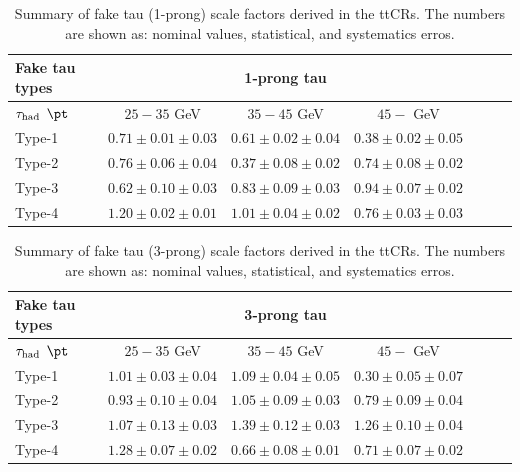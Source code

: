 \begin{table}
\caption{ Summary of fake tau (1-prong) scale factors derived in the ttCRs. The numbers are shown as: nominal values, statistical, and systematics erros. }
\begin{center}
\begin{tabular}{lcccccc}
\toprule\toprule

Fake tau types & \multicolumn{3}{c}{1-prong tau}  \\ \midrule
$\tau_\text{had}$ $\pt$                                   &  $25-35$ GeV  & $35-45$ GeV  &  $45-$ GeV            \\
\midrule
Type-1                          &$0.71 \pm 0.01 \pm 0.03 $ &$0.61 \pm 0.02 \pm 0.04 $ &$0.38 \pm 0.02 \pm 0.05 $  \\
Type-2                          &$0.76 \pm 0.06 \pm 0.04 $ & $0.37 \pm 0.08 \pm 0.02$ & $0.74 \pm 0.08 \pm 0.02 $ \\
Type-3                          &$0.62 \pm 0.10 \pm 0.03 $ &$0.83 \pm 0.09 \pm 0.03 $ &$0.94 \pm 0.07 \pm 0.02 $  \\
Type-4                          &$1.20 \pm 0.02 \pm 0.01 $ & $1.01 \pm 0.04 \pm 0.02 $ &$0.76 \pm 0.03 \pm 0.03 $  \\
\bottomrule\bottomrule
\end{tabular}
\label{tab:ff1_summary}
\end{center}
\end{table}


\begin{table}
\caption{ Summary of fake tau (3-prong) scale factors derived in the ttCRs. The numbers are shown as: nominal values, statistical, and systematics erros. }
\begin{center}
\begin{tabular}{lcccccc}
\toprule\toprule

Fake tau types        & \multicolumn{3}{c}{3-prong tau}  \\ \midrule
$\tau_\text{had}$ $\pt$                             &  $25-35$ GeV  & $35-45$ GeV       &  $45-$ GeV  \\
\midrule
Type-1                                    & $1.01 \pm 0.03 \pm 0.04 $ & $1.09 \pm 0.04 \pm 0.05 $ & $0.30 \pm 0.05 \pm 0.07 $ \\
Type-2                                    & $0.93 \pm 0.10 \pm 0.04 $ & $1.05 \pm 0.09 \pm 0.03 $ & $0.79 \pm 0.09 \pm 0.04 $ \\
Type-3                                    & $1.07 \pm 0.13 \pm 0.03 $ &$1.39 \pm 0.12 \pm 0.03 $ &$1.26 \pm 0.10 \pm 0.04 $  \\
Type-4                                    &$1.28 \pm 0.07 \pm 0.02 $ &$0.66 \pm 0.08 \pm 0.01 $ & $0.71 \pm 0.07 \pm 0.02 $ \\
\bottomrule\bottomrule
\end{tabular}
\label{tab:ff2_summary}
\end{center}
\end{table}



